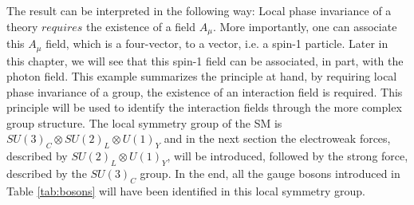 The result can be interpreted in the following way: 
Local phase invariance of a theory $requires$ the existence of a field $A_{\mu}$. 
More importantly, one can associate this $A_{\mu}$ field, which is a four-vector, to a vector, i.e. a spin-1 particle. 
Later in this chapter, we will see that this spin-1 field can be associated, in part, with the photon field.  
This example summarizes the principle at hand, by requiring local phase invariance of a group, the existence of an interaction field is required. 
This principle will be used to identify the interaction fields through the more complex group structure. 
\newpara
\noindent\justify
The local symmetry group of the SM is $SU(3)_{C}\otimes SU(2)_{L}\otimes U(1)_{Y}$ and in the next section the electroweak forces, described by $SU(2)_{L}\otimes U(1)_{Y}$, will be introduced, followed by the strong force, described by the $SU(3)_{C}$ group. 
In the end, all the gauge bosons introduced in Table \ref{tab:bosons} will have been identified in this local symmetry group. 
